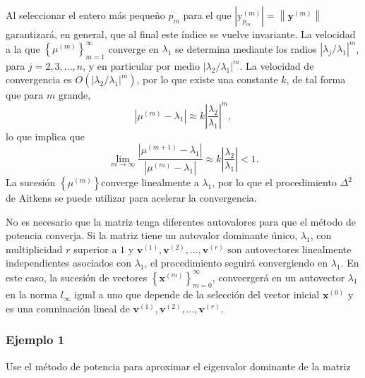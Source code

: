 \documentclass{report}
\numberwithin{subsection}{section} %
\begin{document}
Al seleccionar el entero más pequeño $p_{m}$ para el que $\left| \text{y}_{p_{m}}^{\left( m \right)} \right| = \left\| \textbf{y}^{\left( m \right)} \right\|$ garantizará, en general, que al final este índice se vuelve invariante. La velocidad a la que $\left\{ \mu^{\left( m \right)} \right\}_{m=1}^{\infty }$ converge en $\lambda_{1}$ se determina mediante los radios $\left| \lambda_{j} / \lambda_{1} \right|^{m}$, para $j = 2, 3, ..., n$, y en particular por medio $\left| \lambda_{2} / \lambda_{1} \right|^{m}$. La velocidad de convergencia es $O\left( \left| \lambda_{2} / \lambda_{1} \right|^{m} \right)$, por lo que existe una constante $k$, de tal forma que para $m$ grande,
\begin{equation*}
\left| \mu^{\left( m \right)} - \lambda_{1} \right| \approx k\left| \frac{\lambda_{2}}{\lambda_{1}} \right|^{m},
\end{equation*}
lo que implica que
\begin{equation*}
\lim_{m \to \infty} \frac{\left| \mu^{\left( m + 1 \right)} - \lambda_{1} \right|}{\left| \mu^{\left( m \right)} - \lambda_{1} \right|}  \approx k\left| \frac{\lambda_{2}}{\lambda_{1}} \right| < 1.
\end{equation*}
La sucesión $\left\{ \mu^{\left( m \right)} \right\}$converge linealmente a $\lambda_{1}$, por lo que el procedimiento $\Delta ^{2}$ de Aitkens se puede utilizar para acelerar la convergencia.

No es necesario que la matriz tenga diferentes autovalores para que el método de potencia converja. Si la matriz tiene un autovalor dominante único, $\lambda_{1}$, con multiplicidad $r$ superior a $1$ y $\textbf{v}^{\left( 1 \right)}, \textbf{v}^{\left( 2 \right)}, ..., \textbf{v}^{\left( r \right)}$ son autovectores linealmente independientes asociados con $\lambda_{1}$, el procedimiento seguirá convergiendo en $\lambda_{1}$. En este caso, la sucesión de vectores $\left\{ \textbf{x}^{\left( m \right)} \right\}_{m=0}^{\infty}$, conveergerá en un autovector $\lambda_{1}$ en la norma $l_{\infty}$ igual a uno que depende de la selección del vector inicial $\textbf{x}^{\left( 0 \right)}$ y es una comninación lineal de $\textbf{v}^{\left( 1 \right)}, \textbf{v}^{\left( 2 \right)}, ..., \textbf{v}^{\left( r \right)}$.

\subsubsection*{Ejemplo 1} %

    Use el método de potencia para aproximar el eigenvalor dominante de la matriz
\end{document}
